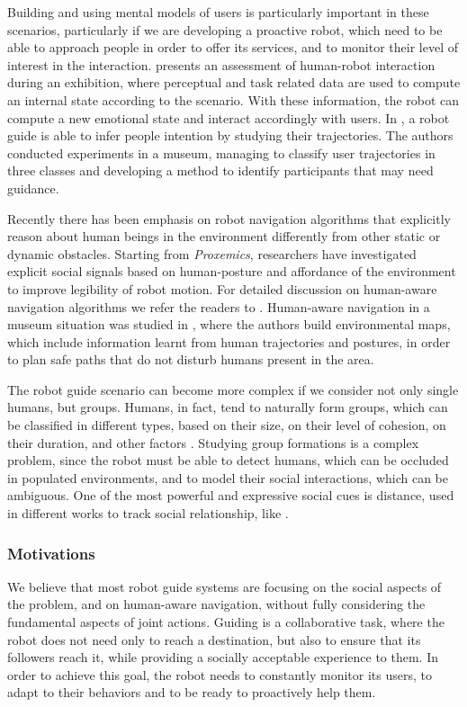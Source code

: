 Building and using mental models of users is particularly important in these scenarios, particularly if we are developing a proactive robot, which need to be able to approach people in order to offer its services, and to monitor their level of interest in the interaction. \cite{Jensen2005} presents an assessment of human-robot interaction during an exhibition, where perceptual and task related data are used to compute an internal state according to the scenario. With these information, the robot can compute a new emotional state and interact accordingly with users.
In \cite{rashed2015toward}, a robot guide is able to infer people intention by studying their trajectories. The authors conducted experiments in a museum, managing to classify user trajectories in three classes and developing a method to identify participants that may need guidance. 

Recently there has been emphasis on robot navigation algorithms that explicitly reason about human beings in the environment differently from other static or dynamic obstacles. Starting from \textit{Proxemics}, researchers have investigated explicit social signals based on human-posture and affordance of the environment to improve legibility of robot motion. For detailed discussion on human-aware navigation algorithms we refer the readers to \cite{kruse2013human,rios-ijsr-2014}. Human-aware navigation in a museum situation was studied in \cite{samejima2015building}, where the authors build environmental maps, which include information learnt from human trajectories and postures, in order to plan safe paths that do not disturb humans present in the area. 

The robot guide scenario can become more complex if we consider not only single humans, but groups. Humans, in fact, tend to naturally form groups, which can be classified in different types, based on their size, on their level of cohesion, on their duration, and other factors \cite{forsyth2009group}.  Studying group formations is a complex problem, since the robot must be able to detect humans, which can be occluded in populated environments, and to model their social interactions, which can be ambiguous. One of the most powerful and expressive social cues is distance, used in different works to track social relationship, like \cite{luber2013multi}. 

\subsubsection{Motivations}
We believe that most robot guide systems are focusing on the social aspects of the problem, and on human-aware navigation, without fully considering the fundamental aspects of joint actions. Guiding is a collaborative task, where the robot does not need only to reach a destination, but also to ensure that its followers reach it, while providing a socially acceptable experience to them. In order to achieve this goal, the robot needs to constantly monitor its users, to adapt to their behaviors and to be ready to proactively help them.

